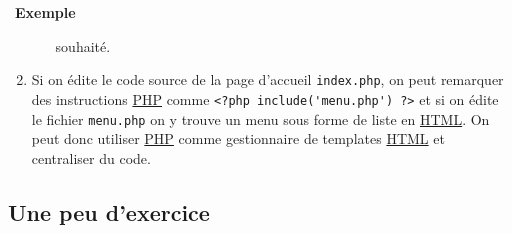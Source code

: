 \documentclass[
  11pt,
]{article}
\newcommand{\passthrough}[1]{#1}
\newcounter{rque}
\newcounter{exple}
\newenvironment{exemple}[1]
{\par \medskip   \addtocounter{exple}{1} \noindent  
\begin{bclogo}[arrondi =0.1,   noborder = true, logo=\bclampe, marge=4]{~\textbf{Exemple} \textbf{\theexple} {\itshape #1} }  \par}
{
\end{bclogo}
 \par \bigskip }
\begin{document}
\begin{exemple}{}
\begin{enumerate}
\begin{itemize}
    souhaité.
  \end{itemize}
\item
  Si on édite le code source de la page d'accueil
  \passthrough{\lstinline!index.php!}, on peut remarquer des
  instructions
  \href{https://developer.mozilla.org/fr/docs/Glossaire/PHP}{PHP} comme
  \passthrough{\lstinline!<?php include('menu.php') ?>!} et si on édite
  le fichier \passthrough{\lstinline!menu.php!} on y trouve un menu sous
  forme de liste en
  \href{https://developer.mozilla.org/fr/docs/Glossaire/HTML}{HTML}. On
  peut donc utiliser
  \href{https://developer.mozilla.org/fr/docs/Glossaire/PHP}{PHP} comme
  gestionnaire de templates
  \href{https://developer.mozilla.org/fr/docs/Glossaire/HTML}{HTML} et
  centraliser du code.
\end{enumerate}

\end{exemple}

\hypertarget{une-peu-dexercice}{%
\subsection{Une peu d'exercice}\label{une-peu-dexercice}}
\end{document}
